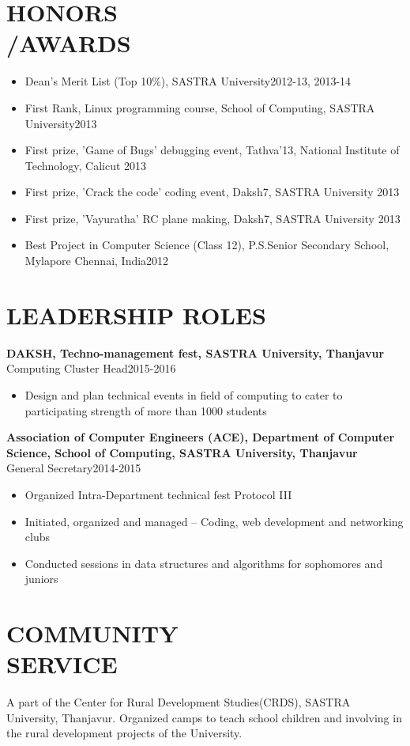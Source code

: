 \documentclass[margin, 10pt]{res} %
\begin{document}
\begin{resume}
{{{{\section{HONORS\\/AWARDS}
\begin{itemize}\itemsep -2pt
\item Dean's Merit List (Top 10\%), SASTRA University\hfill 2012-13, 2013-14
\item First Rank, Linux programming course, School of Computing, SASTRA University\hfill 2013
\item First prize, 'Game of Bugs' debugging event, Tathva'13, National Institute of Technology, Calicut \hfill 2013
\item First prize, 'Crack the code' coding event, Daksh7, SASTRA University \hfill 2013
\item First prize, 'Vayuratha' RC plane making, Daksh7, SASTRA University \hfill 2013
\item Best Project in Computer Science (Class 12), P.S.Senior Secondary School, Mylapore Chennai, India\hfill 2012

\end{itemize}
\section {LEADERSHIP ROLES}
\textbf{DAKSH, Techno-management fest, SASTRA University, Thanjavur}\\
Computing Cluster Head\hfill 2015-2016
\begin{itemize}\itemsep -2pt
\item Design and plan technical events in field of computing to cater to participating strength of more than 1000 students\end{itemize}
\textbf{Association of Computer Engineers (ACE), Department of Computer Science, School of Computing, SASTRA University, Thanjavur}\\
General Secretary\hfill 2014-2015
\begin{itemize}\itemsep -2pt
\item Organized Intra-Department technical fest Protocol III
\item Initiated, organized and managed -- Coding, web development and networking clubs
\item Conducted sessions in data structures and algorithms for sophomores and juniors
\end{itemize}
\section{COMMUNITY \\ SERVICE}
A part of the Center for Rural Development Studies(CRDS), SASTRA University, Thanjavur.
Organized camps to teach school children and involving in the rural development projects of the University.

}}}}
\end{resume}
\end{document}
